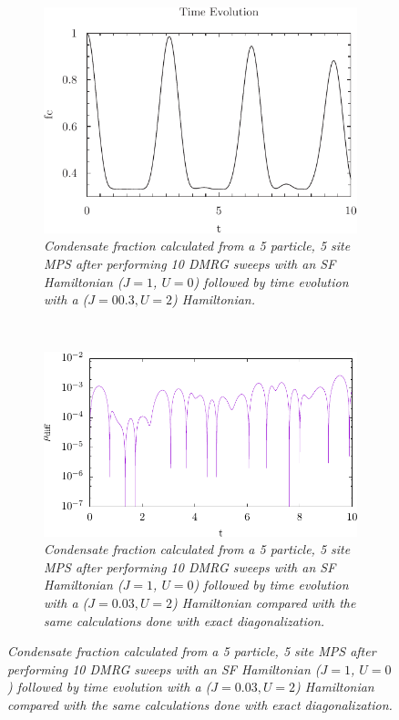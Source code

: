 \begin{figure}[h!]
    \centering
    \begin{subfigure}[t]{0.49\textwidth}
        \includegraphics[width=\textwidth]{Figures/TimeEvo5_U2_J0_03.pdf}
        \caption{\textit{Condensate fraction calculated from a 5 particle, 5 site MPS after performing 10 DMRG sweeps with an SF Hamiltonian ($J=1$, $U=0$) followed by time evolution with a ($J=00.3, U=2$) Hamiltonian.}}
        \label{fig:TimeEvo5_U2_J0_03}
    \end{subfigure}
    ~
    \begin{subfigure}[t]{0.49\textwidth}
        \includegraphics[width=\textwidth]{Figures/TimeEvo5_U2_J0_03_VS_ExactDiag.pdf}
        \caption{\textit{Condensate fraction calculated from a 5 particle, 5 site MPS after performing 10 DMRG sweeps with an SF Hamiltonian ($J=1$, $U=0$) followed by time evolution with a ($J=0.03, U=2$) Hamiltonian compared with the same calculations done with exact diagonalization.}}
        \label{fig:ExDiagComp_U2_J0_03}
    \end{subfigure}
\end{figure}

